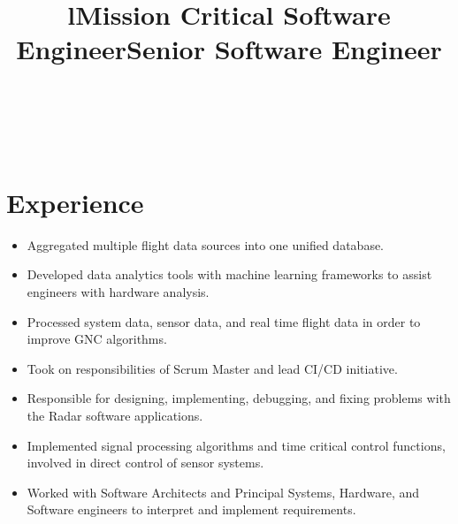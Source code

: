 \documentclass[margin]{res}
\begin{document}
\begin{resume}

\begin{format}
\title{l}\\
\\
\end{format}

\section{Experience}
\phantom{spacing}
\title{\textbf{Mission Critical Software Engineer}}
\begin{position}
\begin{itemize}[noitemsep, topsep=0pt]
\item Aggregated multiple flight data sources into one unified database. 
\item Developed data analytics tools with machine learning frameworks to assist engineers with hardware analysis. 
\item Processed system data, sensor data, and real time flight data in order to improve GNC algorithms. 
\item Took on responsibilities of Scrum Master and lead CI/CD initiative. 
\end{itemize}
\end{position}

\title{\textbf{Senior Software Engineer}}
\begin{position}
\begin{itemize}[noitemsep, topsep=0pt]
\item Responsible for designing, implementing, debugging, and fixing problems with the Radar software applications.
\item Implemented signal processing algorithms and time critical control functions, involved in direct control of sensor systems. 
\item Worked with Software Architects and Principal Systems, Hardware, and Software engineers to interpret and implement requirements. 
\end{itemize}
\end{position}


\end{resume}
\end{document}
